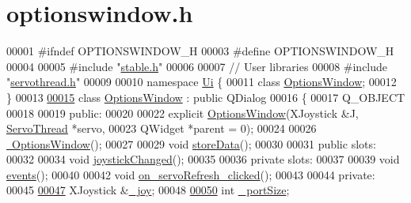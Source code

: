 \hypertarget{optionswindow_8h_source}{}\section{optionswindow.\+h}

\begin{DoxyCode}
00001 \textcolor{preprocessor}{#ifndef OPTIONSWINDOW\_H}
00003 \textcolor{preprocessor}{#define OPTIONSWINDOW\_H}
00004 
00005 \textcolor{preprocessor}{#include "\hyperlink{stable_8h}{stable.h}"}
00006 
00007 \textcolor{comment}{// User libraries}
00008 \textcolor{preprocessor}{#include "\hyperlink{servothread_8h}{servothread.h}"}
00009 
00010 \textcolor{keyword}{namespace }\hyperlink{namespace_ui}{Ui} \{
00011 \textcolor{keyword}{class }\hyperlink{class_options_window}{OptionsWindow};
00012 \}
00013 
\hypertarget{optionswindow_8h_source_l00015}{}\hyperlink{class_options_window}{00015} \textcolor{keyword}{class }\hyperlink{class_options_window}{OptionsWindow} : \textcolor{keyword}{public} QDialog
00016 \{
00017     Q\_OBJECT
00018     
00019 \textcolor{keyword}{public}:
00020     
00022     \textcolor{keyword}{explicit} \hyperlink{class_options_window_ae8e0a610d13a0478bdac57ec7cd4afba}{OptionsWindow}(XJoystick &J, \hyperlink{class_servo_thread}{ServoThread} *servo, 
00023                            QWidget *parent = 0);
00024     
00026     \hyperlink{class_options_window_a034c885fe8bb4416e732a9571d14a6b4}{~OptionsWindow}();
00027     
00029     \textcolor{keywordtype}{void} \hyperlink{class_options_window_ab0a56ad7347c20046602a7a2a1c83397}{storeData}();
00030     
00031 \textcolor{keyword}{public} slots:
00032     
00034     \textcolor{keywordtype}{void} \hyperlink{class_options_window_ae8c0373be58da710194f8d14f1c3c4dc}{joystickChanged}();
00035 
00036 \textcolor{keyword}{private} slots:
00037     
00039     \textcolor{keywordtype}{void} \hyperlink{class_options_window_a18763ff318688083c7ee5a21f22e8e98}{events}();
00040     
00042     \textcolor{keywordtype}{void} \hyperlink{class_options_window_ad5365d452e8bcd86cbb64b9ec42c3b7e}{on\_servoRefresh\_clicked}();
00043     
00044 \textcolor{keyword}{private}:
00045     
\hypertarget{optionswindow_8h_source_l00047}{}\hyperlink{class_options_window_a1bf846ab681ab245f70adac30999947c}{00047}     XJoystick &\hyperlink{class_options_window_a1bf846ab681ab245f70adac30999947c}{\_joy};
00048     
\hypertarget{optionswindow_8h_source_l00050}{}\hyperlink{class_options_window_a9bd4dccc7a544b1db78dc8cf330b88f6}{00050}     \textcolor{keywordtype}{int} \hyperlink{class_options_window_a9bd4dccc7a544b1db78dc8cf330b88f6}{\_portSize};

\end{DoxyCode}
